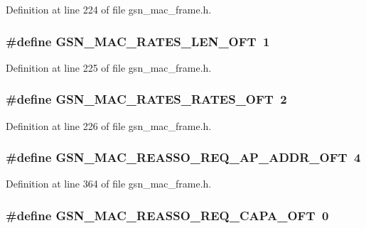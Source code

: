 Definition at line 224 of file gsn\_\-mac\_\-frame.h.

\hypertarget{a00523_a8207acc5c03dd459fc977bbf2164150e}{
\subsubsection[{GSN\_\-MAC\_\-RATES\_\-LEN\_\-OFT}]{\setlength{\rightskip}{0pt plus 5cm}\#define GSN\_\-MAC\_\-RATES\_\-LEN\_\-OFT~1}}
\label{a00523_a8207acc5c03dd459fc977bbf2164150e}


Definition at line 225 of file gsn\_\-mac\_\-frame.h.

\hypertarget{a00523_a61d97f4b24228df313ef32b9f13e0139}{
\subsubsection[{GSN\_\-MAC\_\-RATES\_\-RATES\_\-OFT}]{\setlength{\rightskip}{0pt plus 5cm}\#define GSN\_\-MAC\_\-RATES\_\-RATES\_\-OFT~2}}
\label{a00523_a61d97f4b24228df313ef32b9f13e0139}


Definition at line 226 of file gsn\_\-mac\_\-frame.h.

\hypertarget{a00523_a69667a7675575e73b192c1cc69a6808a}{
\subsubsection[{GSN\_\-MAC\_\-REASSO\_\-REQ\_\-AP\_\-ADDR\_\-OFT}]{\setlength{\rightskip}{0pt plus 5cm}\#define GSN\_\-MAC\_\-REASSO\_\-REQ\_\-AP\_\-ADDR\_\-OFT~4}}
\label{a00523_a69667a7675575e73b192c1cc69a6808a}


Definition at line 364 of file gsn\_\-mac\_\-frame.h.

\hypertarget{a00523_a0fe05527c77ffa06e58303fdff1a91da}{
\subsubsection[{GSN\_\-MAC\_\-REASSO\_\-REQ\_\-CAPA\_\-OFT}]{\setlength{\rightskip}{0pt plus 5cm}\#define GSN\_\-MAC\_\-REASSO\_\-REQ\_\-CAPA\_\-OFT~0}}
\label{a00523_a0fe05527c77ffa06e58303fdff1a91da}


